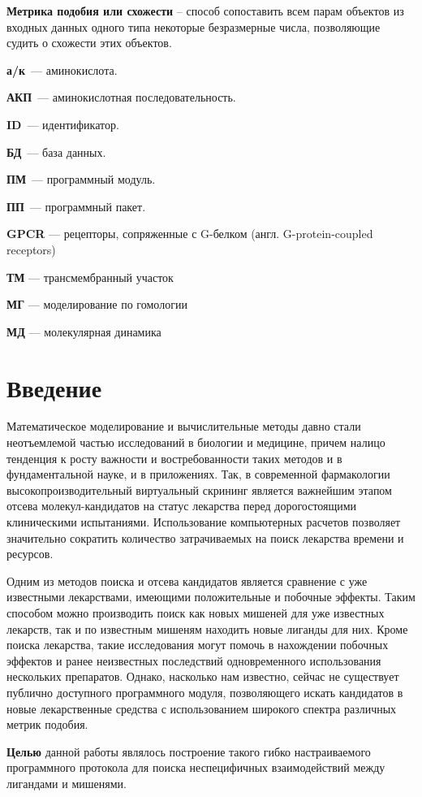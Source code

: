 \documentclass[a4paper,14pt]{article}         %
\begin{document}
\textbf{Метрика подобия или схожести} -- способ сопоставить всем парам объектов из входных данных одного типа некоторые безразмерные числа, позволяющие судить о схожести этих объектов.

\textbf{а/к}~--- аминокислота.

\textbf{АКП}~--- аминокислотная последовательность.

\textbf{ID}~--- идентификатор.

\textbf{БД}~--- база данных.

\textbf{ПМ}~--- программный модуль.

\textbf{ПП}~--- программный пакет.

\color{gray}
\textbf{GPCR} --- рецепторы, сопряженные с G-белком (англ. G-protein-coupled receptors)

\textbf{ТМ} --- трансмембранный участок

\textbf{МГ} --- моделирование по гомологии

\textbf{МД} --- молекулярная динамика
\color{black}

\newpage
\section{Введение}
Математическое моделирование и вычислительные методы давно стали неотъемлемой частью исследований в биологии и медицине, причем налицо тенденция к росту важности и востребованности таких методов и в фундаментальной науке, и в приложениях. Так, в современной фармакологии высокопроизводительный виртуальный скрининг является важнейшим этапом отсева молекул-кандидатов на статус лекарства перед дорогостоящими клиническими испытаниями. Использование компьютерных расчетов позволяет значительно сократить количество затрачиваемых на поиск лекарства времени и ресурсов.

Одним из методов поиска и отсева кандидатов является сравнение с уже известными лекарствами, имеющими положительные и побочные эффекты. Таким способом можно производить поиск как новых мишеней для уже известных лекарств, так и по известным мишеням находить новые лиганды для них. Кроме поиска лекарства, такие исследования могут помочь в нахождении побочных эффектов и ранее неизвестных последствий одновременного использования нескольких препаратов. Однако, насколько нам известно, сейчас не существует публично доступного программного модуля, позволяющего искать кандидатов в новые лекарственные средства с использованием широкого спектра различных метрик подобия.

\textbf{Целью} данной работы являлось построение такого гибко настраиваемого программного протокола для поиска неспецифичных взаимодействий между лигандами и мишенями. 
\end{document}
